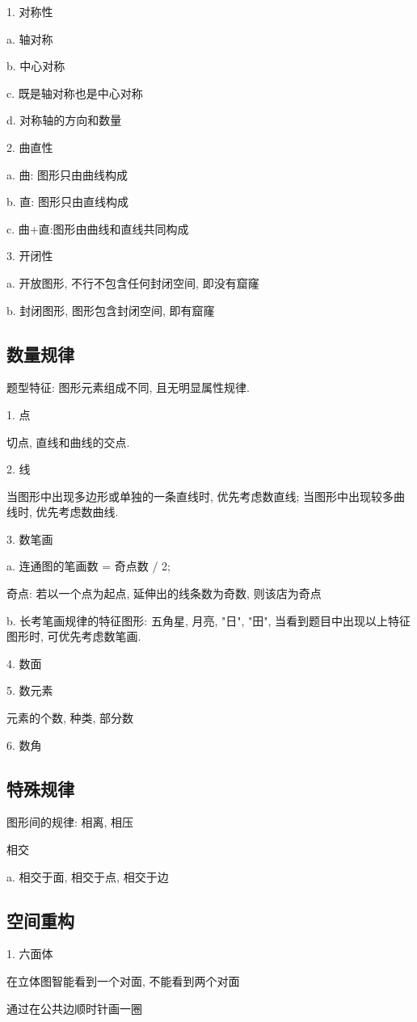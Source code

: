 1. 对称性

a. 轴对称

b. 中心对称

c. 既是轴对称也是中心对称

d. 对称轴的方向和数量

2. 曲直性

a. 曲: 图形只由曲线构成

b. 直: 图形只由直线构成

c. 曲+直:图形由曲线和直线共同构成

3. 开闭性

a. 开放图形, 不行不包含任何封闭空间, 即没有窟窿

b. 封闭图形, 图形包含封闭空间, 即有窟窿


\subsection{数量规律}
题型特征: 图形元素组成不同, 且无明显属性规律.

1. 点

切点, 直线和曲线的交点.

2. 线

当图形中出现多边形或单独的一条直线时, 优先考虑数直线; 当图形中出现较多曲线时, 优先考虑数曲线.

3. 数笔画

a. 连通图的笔画数 = 奇点数 / 2;

奇点: 若以一个点为起点, 延伸出的线条数为奇数, 则该店为奇点

b. 长考笔画规律的特征图形: 五角星, 月亮, "日", "田", 当看到题目中出现以上特征图形时, 可优先考虑数笔画.

4. 数面

5. 数元素

元素的个数, 种类, 部分数

6. 数角
\subsection{特殊规律}

图形间的规律: 相离, 相压

相交

a. 相交于面, 相交于点, 相交于边

\subsection{空间重构}
1. 六面体

在立体图智能看到一个对面, 不能看到两个对面

通过在公共边顺时针画一圈

